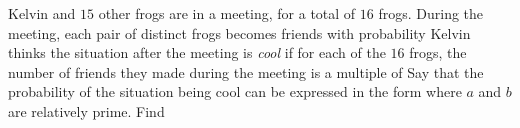 Kelvin and $15$ other frogs are in a meeting, for a total of $16$ frogs. During the meeting, each pair of distinct frogs becomes friends with probability  Kelvin thinks the situation after the meeting is \textit{cool} if for each of the $16$ frogs, the number of friends they made during the meeting is a multiple of  Say that the probability of the situation being cool can be expressed in the form  where $a$ and $b$ are relatively prime. Find 